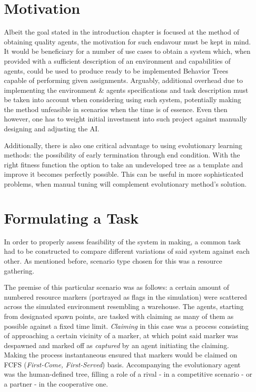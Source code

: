 \section{Motivation}
Albeit the goal stated in the introduction chapter is focused at the method of obtaining quality agents, the motivation for such endavour must be kept in mind. It would be beneficiary for a number of use cases to obtain a system which, when provided with a sufficient description of an environment and capabilities of agents, could be used to produce ready to be implemented Behavior Trees capable of performing given assignments. Arguably, additional overhead due to implementing the environment \& agents specifications and task description must be taken into account when considering using such system, potentially making the method unfeasible in scenarios when the time is of essence. Even then however, one has to weight initial investment into such project against manually designing and adjusting the AI.

Additionally, there is also one critical advantage to using evolutionary learning methods: the possibility of early termination through end condition. With the right fitness function the option to take an undeveloped tree as a template and improve it becomes perfectly possible. This can be useful in more sophisticated problems, when manual tuning will complement evolutionary method's solution. %
\section{Formulating a Task}
In order to properly assess feasibility of the system in making, a common task had to be constructed to compare different variations of said system against each other. As mentioned before, scenario type chosen for this was a resource gathering. %

The premise of this particular scenario was as follows: a certain amount of numbered resource markers (portrayed as flags in the simulation) were scattered across the simulated environment resembling a warehouse. The agents, starting from designated spawn points, are tasked with claiming as many of them as possible against a fixed time limit. \textit{Claiming} in this case was a process consisting of approaching a certain vicinity of a marker, at which point said marker was despawned and marked off as \textit{captured} by an agent initiating the claiming. Making the process instantaneous ensured that markers would be claimed on FCFS (\textit{First-Come, First-Served}) basis. Accompanying the evolutionary agent was the human-defined tree, filling a role of a rival - in a competitive scenario - or a partner - in the cooperative one.


